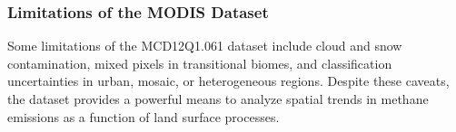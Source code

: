 \subsubsection{Limitations of the MODIS Dataset}
Some limitations of the MCD12Q1.061 dataset include cloud and snow contamination, mixed pixels in transitional biomes, and classification uncertainties in urban, mosaic, or heterogeneous regions. Despite these caveats, the dataset provides a powerful means to analyze spatial trends in methane emissions as a function of land surface processes.

